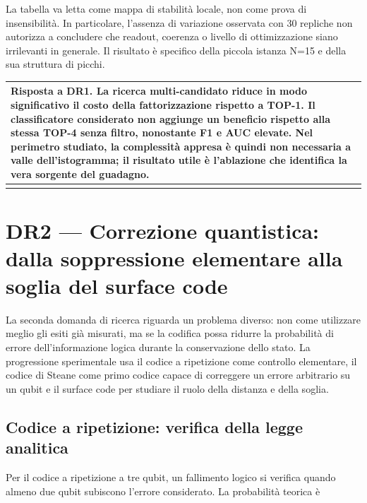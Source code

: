 La tabella va letta come mappa di stabilità locale, non come prova di insensibilità. In particolare, l'assenza di variazione osservata con 30 repliche non autorizza a concludere che readout, coerenza o livello di ottimizzazione siano irrilevanti in generale. Il risultato è specifico della piccola istanza N=15 e della sua struttura di picchi.

{\def\LTcaptype{none} %
\begin{longtable}[]{@{}
  >{\raggedright\arraybackslash}p{}@{}}
\toprule\noalign{}
\begin{minipage}[b]{\linewidth}\raggedright
\textbf{Risposta a DR1.} La ricerca multi-candidato riduce in modo significativo il costo della fattorizzazione rispetto a TOP-1. Il classificatore considerato non aggiunge un beneficio rispetto alla stessa TOP-4 senza filtro, nonostante F1 e AUC elevate. Nel perimetro studiato, la complessità appresa è quindi non necessaria a valle dell'istogramma; il risultato utile è l'ablazione che identifica la vera sorgente del guadagno.
\end{minipage} \\
\midrule\noalign{}
\endhead
\bottomrule\noalign{}
\endlastfoot
\end{longtable}
}

\section{DR2 --- Correzione quantistica: dalla soppressione elementare alla soglia del surface code}\label{sec:finale_5_2}

La seconda domanda di ricerca riguarda un problema diverso: non come utilizzare meglio gli esiti già misurati, ma se la codifica possa ridurre la probabilità di errore dell'informazione logica durante la conservazione dello stato. La progressione sperimentale usa il codice a ripetizione come controllo elementare, il codice di Steane come primo codice capace di correggere un errore arbitrario su un qubit e il surface code per studiare il ruolo della distanza e della soglia.

\subsection{Codice a ripetizione: verifica della legge analitica}\label{sec:finale_5_2_1}\label{sec:repetition}

Per il codice a ripetizione a tre qubit, un fallimento logico si verifica quando almeno due qubit subiscono l'errore considerato. La probabilità teorica è

